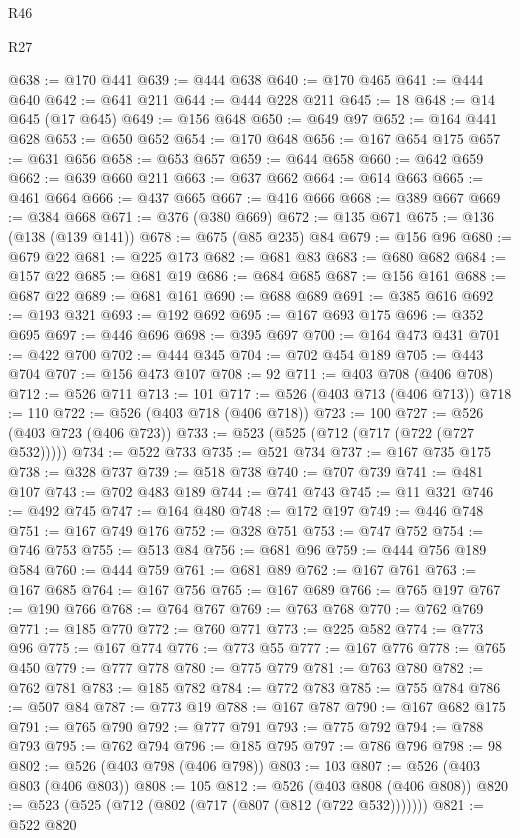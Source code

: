 \begin{lexlean}{R46}
\begin{lexlean}{R27}
\begin{coremodule}
{{{{{{{{{{{{{{{{{{{{{{{{{{{{{{{{{{{{{{{{{{{{{{{{{{{{{{{{{{{{{{@638 := @170 @441
@639 := @444 @638
@640 := @170 @465
@641 := @444 @640
@642 := @641 @211
@644 := @444 @228 @211
@645 := 18
@648 := @14 @645 (@17 @645)
@649 := @156 @648
@650 := @649 @97
@652 := @164 @441 @628
@653 := @650 @652
@654 := @170 @648
@656 := @167 @654 @175
@657 := @631 @656
@658 := @653 @657
@659 := @644 @658
@660 := @642 @659
@662 := @639 @660 @211
@663 := @637 @662
@664 := @614 @663
@665 := @461 @664
@666 := @437 @665
@667 := @416 @666
@668 := @389 @667
@669 := @384 @668
@671 := @376 (@380 @669)
@672 := @135 @671
@675 := @136 (@138 (@139 @141))
@678 := @675 (@85 @235) @84
@679 := @156 @96
@680 := @679 @22
@681 := @225 @173
@682 := @681 @83
@683 := @680 @682
@684 := @157 @22
@685 := @681 @19
@686 := @684 @685
@687 := @156 @161
@688 := @687 @22
@689 := @681 @161
@690 := @688 @689
@691 := @385 @616
@692 := @193 @321
@693 := @192 @692
@695 := @167 @693 @175
@696 := @352 @695
@697 := @446 @696
@698 := @395 @697
@700 := @164 @473 @431
@701 := @422 @700
@702 := @444 @345
@704 := @702 @454 @189
@705 := @443 @704
@707 := @156 @473 @107
@708 := 92
@711 := @403 @708 (@406 @708)
@712 := @526 @711
@713 := 101
@717 := @526 (@403 @713 (@406 @713))
@718 := 110
@722 := @526 (@403 @718 (@406 @718))
@723 := 100
@727 := @526 (@403 @723 (@406 @723))
@733 := @523 (@525 (@712 (@717 (@722 (@727 @532)))))
@734 := @522 @733
@735 := @521 @734
@737 := @167 @735 @175
@738 := @328 @737
@739 := @518 @738
@740 := @707 @739
@741 := @481 @107
@743 := @702 @483 @189
@744 := @741 @743
@745 := @11 @321
@746 := @492 @745
@747 := @164 @480
@748 := @172 @197
@749 := @446 @748
@751 := @167 @749 @176
@752 := @328 @751
@753 := @747 @752
@754 := @746 @753
@755 := @513 @84
@756 := @681 @96
@759 := @444 @756 @189 @584
@760 := @444 @759
@761 := @681 @89
@762 := @167 @761
@763 := @167 @685
@764 := @167 @756
@765 := @167 @689
@766 := @765 @197
@767 := @190 @766
@768 := @764 @767
@769 := @763 @768
@770 := @762 @769
@771 := @185 @770
@772 := @760 @771
@773 := @225 @582
@774 := @773 @96
@775 := @167 @774
@776 := @773 @55
@777 := @167 @776
@778 := @765 @450
@779 := @777 @778
@780 := @775 @779
@781 := @763 @780
@782 := @762 @781
@783 := @185 @782
@784 := @772 @783
@785 := @755 @784
@786 := @507 @84
@787 := @773 @19
@788 := @167 @787
@790 := @167 @682 @175
@791 := @765 @790
@792 := @777 @791
@793 := @775 @792
@794 := @788 @793
@795 := @762 @794
@796 := @185 @795
@797 := @786 @796
@798 := 98
@802 := @526 (@403 @798 (@406 @798))
@803 := 103
@807 := @526 (@403 @803 (@406 @803))
@808 := 105
@812 := @526 (@403 @808 (@406 @808))
@820 := @523 (@525 (@712 (@802 (@717 (@807 (@812 (@722 @532)))))))
@821 := @522 @820
}}}}}}}}}}}}}}}}}}}}}}}}}}}}}}}}}}}}}}}}}}}}}}}}}}}}}}}}}}}}}}
\end{coremodule}
\end{lexlean}
\end{lexlean}
